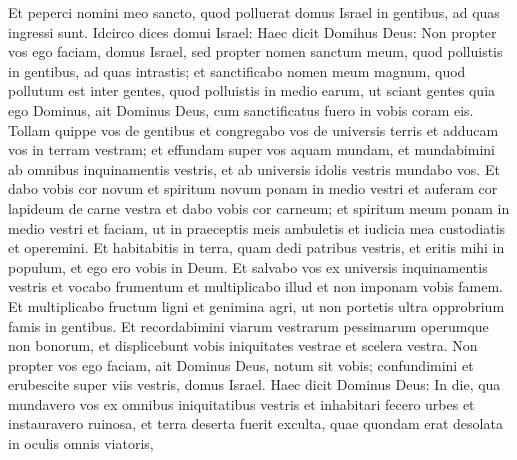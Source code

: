 \begin{biblechapter}
\begin{biblechapter}
\begin{biblechapter}
\begin{biblechapter}
\begin{biblechapter}
\begin{biblechapter}
\begin{biblechapter}
\begin{biblechapter}
\begin{biblechapter}
\begin{biblechapter}
\begin{biblechapter}
\begin{biblechapter}
\begin{biblechapter}
\begin{biblechapter}
\begin{biblechapter}
\begin{biblechapter}
\begin{biblechapter}
\begin{biblechapter}
\begin{biblechapter}
\begin{biblechapter}
\begin{biblechapter}
\begin{biblechapter}
\begin{biblechapter}
\begin{biblechapter}
\begin{biblechapter}
\begin{biblechapter}
\begin{biblechapter}
\begin{biblechapter}
\begin{biblechapter}
\begin{biblechapter}
\begin{biblechapter}
\begin{biblechapter}
\begin{biblechapter}
\begin{biblechapter}
\begin{biblechapter}
\begin{biblechapter}
 \verse Et peperci nomini meo sancto, quod polluerat domus Israel in gentibus, ad quas ingressi sunt.
 \verse Idcirco dices domui Israel: Haec dicit Domihus Deus: Non propter vos ego faciam, domus Israel, sed propter nomen sanctum meum, quod polluistis in gentibus, ad quas intrastis; 
\verse et sanctificabo nomen meum magnum, quod pollutum est inter gentes, quod polluistis in medio earum, ut sciant gentes quia ego Dominus, ait Dominus Deus, cum sanctificatus fuero in vobis coram eis. 
 \verse Tollam quippe vos de gentibus et congregabo vos de universis terris et adducam vos in terram vestram; 
\verse et effundam super vos aquam mundam, et mundabimini ab omnibus inquinamentis vestris, et ab universis idolis vestris mundabo vos. 
\verse Et dabo vobis cor novum et spiritum novum ponam in medio vestri et auferam cor lapideum de carne vestra et dabo vobis cor carneum; 
\verse et spiritum meum ponam in medio vestri et faciam, ut in praeceptis meis ambuletis et iudicia mea custodiatis et operemini. 
\verse Et habitabitis in terra, quam dedi patribus vestris, et eritis mihi in populum, et ego ero vobis in Deum. 
\verse Et salvabo vos ex universis inquinamentis vestris et vocabo frumentum et multiplicabo illud et non imponam vobis famem. 
\verse Et multiplicabo fructum ligni et genimina agri, ut non portetis ultra opprobrium famis in gentibus. 
\verse Et recordabimini viarum vestrarum pessimarum operumque non bonorum, et displicebunt vobis iniquitates vestrae et scelera vestra. 
\verse Non propter vos ego faciam, ait Dominus Deus, notum sit vobis; confundimini et erubescite super viis vestris, domus Israel.
 \verse Haec dicit Dominus Deus: In die, qua mundavero vos ex omnibus iniquitatibus vestris et inhabitari fecero urbes et instauravero ruinosa, 
\verse et terra deserta fuerit exculta, quae quondam erat desolata in oculis omnis viatoris, 

\end{biblechapter}
\end{biblechapter}
\end{biblechapter}
\end{biblechapter}
\end{biblechapter}
\end{biblechapter}
\end{biblechapter}
\end{biblechapter}
\end{biblechapter}
\end{biblechapter}
\end{biblechapter}
\end{biblechapter}
\end{biblechapter}
\end{biblechapter}
\end{biblechapter}
\end{biblechapter}
\end{biblechapter}
\end{biblechapter}
\end{biblechapter}
\end{biblechapter}
\end{biblechapter}
\end{biblechapter}
\end{biblechapter}
\end{biblechapter}
\end{biblechapter}
\end{biblechapter}
\end{biblechapter}
\end{biblechapter}
\end{biblechapter}
\end{biblechapter}
\end{biblechapter}
\end{biblechapter}
\end{biblechapter}
\end{biblechapter}
\end{biblechapter}
\end{biblechapter}
